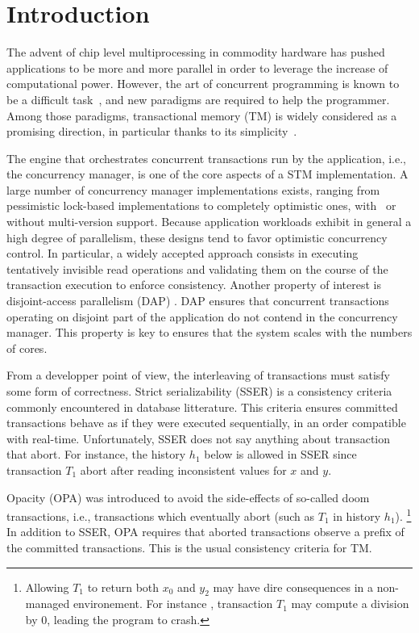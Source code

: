 \section{Introduction}

The advent of chip level multiprocessing in commodity hardware has pushed applications to be more and more parallel in order to leverage the increase of computational power.
However, the art of concurrent programming is known to be a difficult task~\cite{Lee:2006:PT:1137232.1137289}, and new paradigms are required to help the programmer.
Among those paradigms, transactional memory (TM) is widely considered as a promising direction, in particular thanks to its simplicity~\cite{Dragojevic:2011:WSM:1924421.1924440}.

The engine that orchestrates concurrent transactions run by the application, i.e., the concurrency manager, is one of the core aspects of a STM implementation.
A large number of concurrency manager implementations exists, ranging from pessimistic lock-based implementations to completely optimistic ones, with~\cite{perelman2011smv} or without multi-version support.
Because application workloads exhibit in general a high degree of parallelism, these designs tend to favor optimistic concurrency control.
In particular, a widely accepted approach consists in executing tentatively invisible read operations and validating them on the course of the transaction execution to enforce consistency.
Another property of interest is disjoint-access parallelism (DAP) \cite{}.
DAP ensures that concurrent transactions operating on disjoint part of the application do not contend in the concurrency manager.
This property is key to ensures that the system scales with the numbers of cores.

From a developper point of view, the interleaving of transactions must satisfy some form of correctness.
Strict serializability (SSER) is a consistency criteria commonly encountered in database litterature.
This criteria ensures committed transactions behave as if they were executed sequentially, in an order compatible with real-time.
Unfortunately, SSER does not say anything about transaction that abort.
For instance, the history $h_1$ below is allowed in SSER since transaction $T_1$ abort after reading inconsistent values for $x$ and $y$.

Opacity (OPA) was introduced to avoid the side-effects of so-called doom transactions, i.e., transactions which eventually abort (such as $T_1$ in history $h_1$).%
\footnote{  
  Allowing $T_1$ to return both $x_0$ and $y_2$ may have dire consequences in a non-managed environement.
  For instance \cite{opa}, transaction $T_1$ may compute a division by $0$, leading the program to crash.
}
In addition to SSER, OPA requires that aborted transactions observe a prefix of the committed transactions.
This is the usual consistency criteria for TM.

